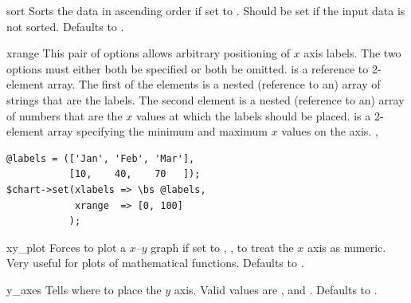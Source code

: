 \begin{AttrDecl}{sort}
Sorts the data in ascending order if set to . Should be
set if the input data is not sorted. Defaults to .
\end{AttrDecl}

\begin{AttrDecl}{xrange}
This pair of options allows arbitrary positioning of $x$ axis labels.
The two options must either both be specified or both be omitted.
 is a reference to 2-element array. The first of the
elements is a nested (reference to an) array of strings that are the
labels. The second element is a nested (reference to an) array of
numbers that are the $x$ values at which the labels should be placed.
 is a 2-element array specifying the minimum and maximum
$x$ values on the axis. \Eg,
\begin{verbatim}
@labels = (['Jan', 'Feb', 'Mar'],
           [10,    40,    70   ]);
$chart->set(xlabels => \bs @labels,
            xrange  => [0, 100]
           );
\end{verbatim}
\end{AttrDecl}

\begin{AttrDecl}{xy\_plot}
Forces \thisclass to plot a $x$--$y$ graph if set to ,
\ie, to treat the $x$ axis as numeric. Very useful for plots of
mathematical functions. Defaults to .
\end{AttrDecl}

\begin{AttrDecl}{y\_axes}
Tells \thisclass where to place the $y$ axis. Valid
values are ,  and . Defaults
to .
\end{AttrDecl}

